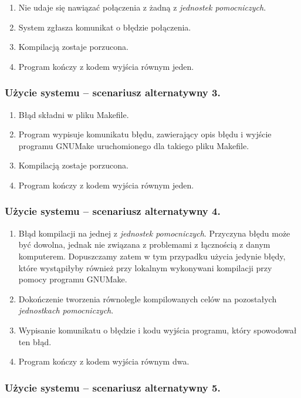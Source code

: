 \documentclass[a4paper]{article}
\begin{document}
\begin{enumerate}
	\item Nie udaje się nawiązać połączenia z żadną z \emph{jednostek pomocniczych}.
	\item System zgłasza komunikat o błędzie połączenia.
	\item Kompilacją zostaje porzucona.
	\item Program kończy z kodem wyjścia równym jeden.
\end{enumerate}

\subsubsection{Użycie systemu -- scenariusz alternatywny 3.}

\begin{enumerate}
	\item Błąd składni w pliku Makefile.
	\item Program wypisuje komunikatu błędu, zawierający opis błędu i wyjście programu GNUMake uruchomionego dla takiego pliku Makefile.
	\item Kompilacją zostaje porzucona.
	\item Program kończy z kodem wyjścia równym jeden.
\end{enumerate}

\subsubsection{Użycie systemu -- scenariusz alternatywny 4.}

\begin{enumerate}
	\item Błąd kompilacji na jednej z \emph{jednostek pomocniczych}. Przyczyna błędu może być dowolna, jednak nie związana z problemami z łącznością z danym komputerem. Dopuszczamy zatem w tym przypadku użycia jedynie błędy, które wystąpiłyby również przy lokalnym wykonywani kompilacji przy pomocy programu GNUMake.
	\item Dokończenie tworzenia równolegle kompilowanych celów na pozostałych \emph{jednostkach pomocniczych}.
	\item Wypisanie komunikatu o błędzie i kodu wyjścia programu, który spowodował ten błąd.
	\item Program kończy z kodem wyjścia równym dwa.
\end{enumerate}

\subsubsection{Użycie systemu -- scenariusz alternatywny 5.}
\end{document}
